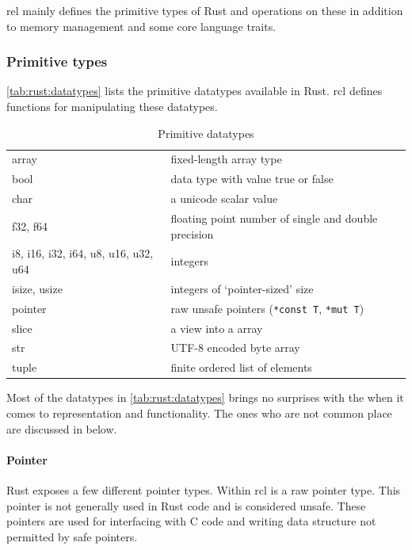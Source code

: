 \gls{rel} mainly defines the primitive types of Rust and operations on these in addition to memory management and some core language traits.

\subsubsection{Primitive types}

\autoref{tab:rust:datatypes} lists the primitive datatypes available in Rust.
\gls{rcl} defines functions for manipulating these datatypes.

\begin{table}[H]
  \begin{tabular}{l|l}
    array    & fixed-length array type \\
    bool     & data type with value true or false \\
    char     & a unicode scalar value \\
    f32, f64 & floating point number of single and double precision \\
    i8, i16, i32, i64, u8, u16, u32, u64 & integers \\
    isize, usize & integers of `pointer-sized' size \\
    pointer      & raw unsafe pointers (\texttt{*const T}, \texttt{*mut T}) \\
    slice        & a view into a array \\
    str          & UTF-8 encoded byte array \\
    tuple & finite ordered list of elements
  \end{tabular}

  \caption{Primitive datatypes}
  \label{tab:rust:datatypes}
\end{table}

Most of the datatypes in \autoref{tab:rust:datatypes} brings no surprises with the when it comes to representation and functionality.
The ones who are not common place are discussed in below.

\paragraph{Pointer}

Rust exposes a few different pointer types.
Within \gls{rcl} is a raw pointer type.
This pointer is not generally used in Rust code and is considered unsafe.
These pointers are used for interfacing with C code and writing data structure not permitted by safe pointers. 

